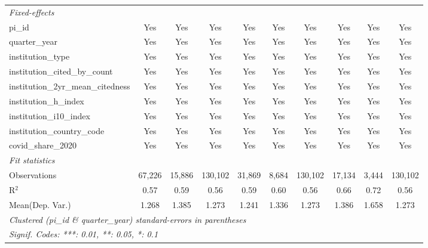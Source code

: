 \begin{tabular}{lccccccccc}
   \midrule
   \emph{Fixed-effects}\\
   pi\_id                                                      & Yes           & Yes           & Yes           & Yes           & Yes            & Yes           & Yes           & Yes            & Yes\\  
   quarter\_year                                               & Yes           & Yes           & Yes           & Yes           & Yes            & Yes           & Yes           & Yes            & Yes\\  
   institution\_type                                           & Yes           & Yes           & Yes           & Yes           & Yes            & Yes           & Yes           & Yes            & Yes\\  
   institution\_cited\_by\_count                               & Yes           & Yes           & Yes           & Yes           & Yes            & Yes           & Yes           & Yes            & Yes\\  
   institution\_2yr\_mean\_citedness                           & Yes           & Yes           & Yes           & Yes           & Yes            & Yes           & Yes           & Yes            & Yes\\  
   institution\_h\_index                                       & Yes           & Yes           & Yes           & Yes           & Yes            & Yes           & Yes           & Yes            & Yes\\  
   institution\_i10\_index                                     & Yes           & Yes           & Yes           & Yes           & Yes            & Yes           & Yes           & Yes            & Yes\\  
   institution\_country\_code                                  & Yes           & Yes           & Yes           & Yes           & Yes            & Yes           & Yes           & Yes            & Yes\\  
   covid\_share\_2020                                          & Yes           & Yes           & Yes           & Yes           & Yes            & Yes           & Yes           & Yes            & Yes\\  
   \midrule
   \emph{Fit statistics}\\
   Observations                                                & 67,226        & 15,886        & 130,102       & 31,869        & 8,684          & 130,102       & 17,134        & 3,444          & 130,102\\  
   R$^2$                                                       & 0.57          & 0.59          & 0.56          & 0.59          & 0.60           & 0.56          & 0.66          & 0.72           & 0.56\\  
Mean(Dep. Var.) & 1.268 & 1.385 & 1.273 & 1.241 & 1.336 & 1.273 & 1.386 & 1.658 & 1.273 \\
   \midrule \midrule
   \multicolumn{10}{l}{\emph{Clustered (pi\_id \& quarter\_year) standard-errors in parentheses}}\\
   \multicolumn{10}{l}{\emph{Signif. Codes: ***: 0.01, **: 0.05, *: 0.1}}\\
\end{tabular}
\par\endgroup
